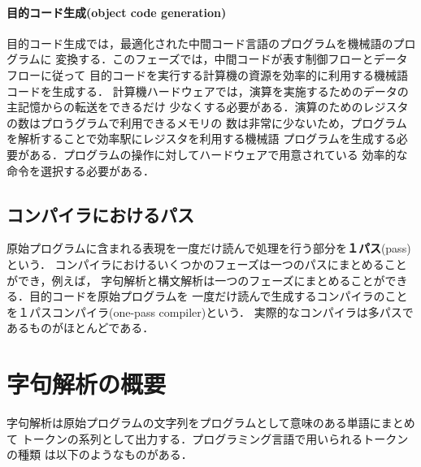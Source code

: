 \documentclass[dvipdfmx,a4j]{jbook}
\begin{document}
\paragraph{{\bf 目的コード生成}(object code generation)}
目的コード生成では，最適化された中間コード言語のプログラムを機械語のプログラムに
変換する．このフェーズでは，中間コードが表す制御フローとデータフローに従って
目的コードを実行する計算機の資源を効率的に利用する機械語コードを生成する．
計算機ハードウェアでは，演算を実施するためのデータの主記憶からの転送をできるだけ
少なくする必要がある．演算のためのレジスタの数はプロうグラムで利用できるメモリの
数は非常に少ないため，プログラムを解析することで効率駅にレジスタを利用する機械語
プログラムを生成する必要がある．プログラムの操作に対してハードウェアで用意されている
効率的な命令を選択する必要がある．

\subsection{コンパイラにおけるパス}
原始プログラムに含まれる表現を一度だけ読んで処理を行う部分を{\bf １パス}(pass)という．
コンパイラにおけるいくつかのフェーズは一つのパスにまとめることができ，例えば，
字句解析と構文解析は一つのフェーズにまとめることができる．目的コードを原始プログラムを
一度だけ読んで生成するコンパイラのことを１パスコンパイラ(one-pass compiler)という．
実際的なコンパイラは多パスであるものがほとんどである．

\section{字句解析の概要}

字句解析は原始プログラムの文字列をプログラムとして意味のある単語にまとめて
トークンの系列として出力する．プログラミング言語で用いられるトークンの種類
は以下のようなものがある．
\end{document}
